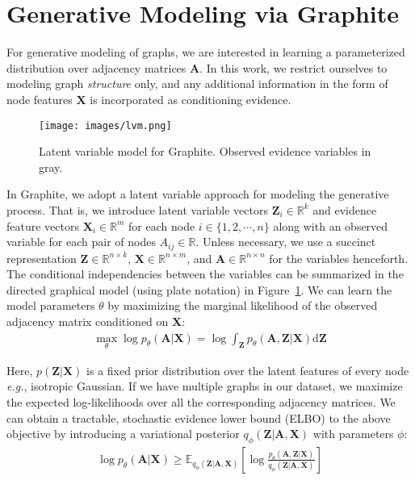 \documentclass{article}
\newcommand{\name}{Graphite}
\begin{document}
 \section{Generative Modeling via \name{}}\label{sec:framework}


For generative modeling of graphs, we are interested in learning a parameterized distribution over adjacency matrices $\mathbf{A}$. In this work, we restrict ourselves to modeling graph \textit{structure} only, and any additional information in the form of node features $\mathbf{X}$ is incorporated as conditioning evidence.

\begin{figure}[t]
\centering
\texttt{[image: images/lvm.png]}
\caption{Latent variable model for \name{}. Observed evidence variables in gray.}\label{fig:lvm}
\end{figure}
In \name{}, we adopt a latent variable approach for modeling the generative process. That is, we introduce latent variable vectors $\mathbf{Z}_i \in \mathbb{R}^{k}$ and evidence feature vectors 
$\mathbf{X}_i \in \mathbb{R}^{m}$ for each node $i \in \{1,2,\cdots,n\}$ along with an observed variable for each pair of nodes $A_{ij} \in \mathbb{R}$. Unless necessary, we use a succinct representation $\mathbf{Z} \in \mathbb{R}^{n \times k}$, $\mathbf{X} \in \mathbb{R}^{n \times m}$, and $\mathbf{A} \in \mathbb{R}^{n \times n}$ for the variables henceforth. 
The conditional independencies between the variables can be summarized in the directed graphical model (using plate notation) in Figure~\ref{fig:lvm}. We can learn the model parameters $\theta$ by maximizing the marginal likelihood of the observed adjacency matrix conditioned on $\mathbf{X}$:
\begin{align}\label{eq:marginal_ll}
\max_\theta \log p_\theta (\mathbf{A} \vert \mathbf{X}) = \log \int_{\mathbf{Z}} p_\theta (\mathbf{A}, \mathbf{Z} \vert \mathbf{X}) \mathrm{d}\mathbf{Z}
\end{align}

Here, $p(\mathbf{Z} \vert \mathbf{X})$ is a fixed prior distribution over the latent features of every node \textit{e.g.}, isotropic Gaussian.
If we have multiple graphs in our dataset, we maximize the expected log-likelihoods over all the corresponding adjacency matrices. We can obtain a tractable, stochastic evidence lower bound (ELBO) to the above objective by
introducing a variational posterior $q_\phi(\mathbf{Z}  \vert \mathbf{A}, \mathbf{X})$ with parameters $\phi$: 
\begin{align}\label{eq:elbo}
\log p_\theta (\mathbf{A} \vert \mathbf{X}) \geq \mathbb{E}_{q_\phi(\mathbf{Z}\vert \mathbf{A}, \mathbf{X})}\left [\log \frac{p_\theta(\mathbf{A}, \mathbf{Z} \vert \mathbf{X})}{q_\phi(\mathbf{Z}\vert \mathbf{A}, \mathbf{X})}\right]
\end{align}
\end{document}
